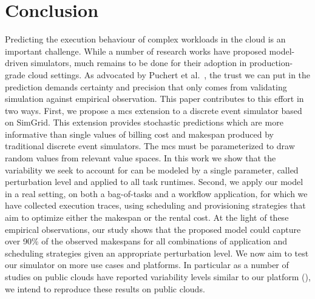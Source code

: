 \documentclass[]{llncs}
\begin{document}
\section{Conclusion}
Predicting  the execution  behaviour of complex  workloads in  the  cloud is  an
important challenge. While a number of research works have proposed model-driven
simulators, much remains to be done for their adoption in production-grade cloud
settings. As  advocated by Puchert  et al.~\cite{PucherGWK15}, the trust  we can
put in  the prediction  demands certainty  and precision  that only  comes from
validating simulation against empirical observation.
%
This paper contributes to this effort in two ways. First, we propose a \acl{mcs}
extension  to a  discrete  event  simulator based  on  SimGrid.  This  extension
provides stochastic predictions which are more informative than single values of
billing cost  and makespan  produced by  traditional discrete  event simulators.
The \acl{mcs}  must be parameterized to  draw random values from  relevant value
spaces. In this work we show that the  variability we seek to account for can be
modeled  by a  single parameter,  called perturbation  level and applied  to all
task runtimes. Second, we apply our model in  a real setting, on both a
bag-of-tasks and a workflow  application, for which we have collected  execution
traces, using scheduling and provisioning strategies that  aim to optimize
either the makespan or the  rental cost.  At  the light of  these empirical
observations,  our study shows that the proposed model could capture over 90\%
of the observed makespans for  all  combinations  of  application   and
scheduling  strategies  given  an appropriate perturbation  level. We now aim
to test our simulator  on more use cases and platforms.  In particular as a
number of studies on public clouds have reported variability levels similar to
our platform (\cite{LeitnerC16,pics}), we intend to reproduce these results on
public clouds.



\end{document}
